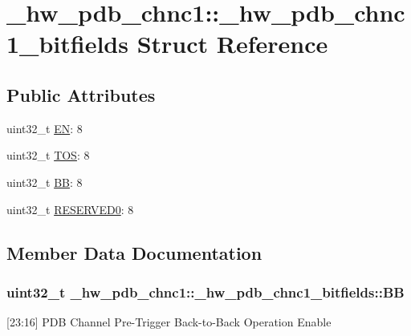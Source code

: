 \hypertarget{struct__hw__pdb__chnc1_1_1__hw__pdb__chnc1__bitfields}{}\section{\+\_\+hw\+\_\+pdb\+\_\+chnc1\+:\+:\+\_\+hw\+\_\+pdb\+\_\+chnc1\+\_\+bitfields Struct Reference}
\label{struct__hw__pdb__chnc1_1_1__hw__pdb__chnc1__bitfields}
\subsection*{Public Attributes}
\begin{DoxyCompactItemize}
\item 
uint32\+\_\+t \hyperlink{struct__hw__pdb__chnc1_1_1__hw__pdb__chnc1__bitfields_a80438054d954603be54f7017eb17040b}{EN}\+: 8
\item 
uint32\+\_\+t \hyperlink{struct__hw__pdb__chnc1_1_1__hw__pdb__chnc1__bitfields_a4888a8c7af688c5b557d3e363f4b6a15}{T\+OS}\+: 8
\item 
uint32\+\_\+t \hyperlink{struct__hw__pdb__chnc1_1_1__hw__pdb__chnc1__bitfields_ad6980d80dd19cf89472131d1149779ea}{BB}\+: 8
\item 
uint32\+\_\+t \hyperlink{struct__hw__pdb__chnc1_1_1__hw__pdb__chnc1__bitfields_af85e26a6185af5f9c6b8feeed6dd5421}{R\+E\+S\+E\+R\+V\+E\+D0}\+: 8
\end{DoxyCompactItemize}


\subsection{Member Data Documentation}
\subsubsection[{\texorpdfstring{BB}{BB}}]{\setlength{\rightskip}{0pt plus 5cm}uint32\+\_\+t \+\_\+hw\+\_\+pdb\+\_\+chnc1\+::\+\_\+hw\+\_\+pdb\+\_\+chnc1\+\_\+bitfields\+::\+BB}\hypertarget{struct__hw__pdb__chnc1_1_1__hw__pdb__chnc1__bitfields_ad6980d80dd19cf89472131d1149779ea}{}\label{struct__hw__pdb__chnc1_1_1__hw__pdb__chnc1__bitfields_ad6980d80dd19cf89472131d1149779ea}
\mbox{[}23\+:16\mbox{]} P\+DB Channel Pre-\/\+Trigger Back-\/to-\/\+Back Operation Enable 
